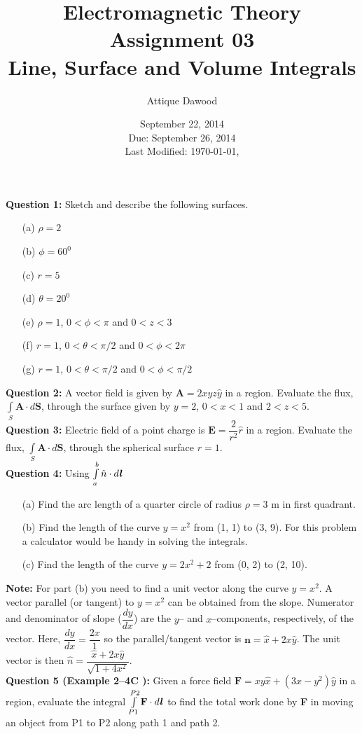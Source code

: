 \documentclass[12pt,a4paper]{article}
\title{Electromagnetic Theory\\Assignment 03\\Line, Surface and Volume Integrals}
\author{Attique Dawood}
\date{September 22, 2014\\Due: September 26, 2014\\[0.2cm] Last Modified: \today, \currenttime}
\begin{document}
\maketitle
\noindent\textbf{Question 1:} Sketch and describe the following surfaces.
\begin{itemize}
\item[(a)] $\rho=2$
\item[(b)] $\phi=60^0$
\item[(c)] $r=5$
\item[(d)] $\theta=20^0$
\item[(e)] $\rho=1$, $0<\phi<\pi$ and $0<z<3$
\item[(f)] $r=1$, $0<\theta<\pi/2$ and $0<\phi<2\pi$
\item[(g)] $r=1$, $0<\theta<\pi/2$ and $0<\phi<\pi/2$
\end{itemize}
\noindent\textbf{Question 2:} A vector field is given by $\textbf{A}=2xyz\hat y$ in a region. Evaluate the flux, $\int\limits_{S}\textbf{A}\cdot d\textbf{S}$, through the surface given by $y=2$, $0<x<1$ and $2<z<5$.\\[0.2cm]
\noindent\textbf{Question 3:} Electric field of a point charge is $\textbf{E}=\dfrac{2}{r^2}\hat r$ in a region. Evaluate the flux, $\int\limits_{S}\textbf{A}\cdot d\textbf{S}$, through the spherical surface $r=1$.\\[0.2cm]
\noindent\textbf{Question 4:} Using $\int\limits_{a}^{b}\hat n\cdot d\textbf{\textit{l}}$
\begin{itemize}
\item[(a)] Find the arc length of a quarter circle of radius $\rho=3$ m in first quadrant.
\item[(b)] Find the length of the curve $y=x^2$ from (1, 1) to (3, 9). For this problem a calculator would be handy in solving the integrals.
\item[(c)] Find the length of the curve $y=2x^2+2$ from (0, 2) to (2, 10).
\end{itemize}
\noindent\textbf{Note:} For part (b) you need to find a unit vector along the curve $y=x^2$. A vector parallel (or tangent) to $y=x^2$ can be obtained from the slope. Numerator and denominator of slope ($\dfrac{dy}{dx}$) are the $y$-- and $x$--components, respectively, of the vector. Here, $\dfrac{dy}{dx}=\dfrac{2x}{1}$ so the parallel/tangent vector is $\textbf{n}=\hat x+2x\hat y$. The unit vector is then $\hat n=\dfrac{\hat x+2x\hat y}{\sqrt{1+4x^2}}$.\\[0.2cm]
\newpage
\noindent\textbf{Question 5 (Example 2--4C \cite[Example 2--4, page 23]{Cheng}):} Given a force field $\textbf{F}=xy\hat x+(3x-y^2)\hat y$ in a region, evaluate the integral $\int\limits_{P1}^{P2}\textbf{F}\cdot d\textbf{\textit{l}}$ to find the total work done by \textbf{F} in moving an object from P1 to P2 along path 1 and path 2.\\[0.2cm]
\end{document}
